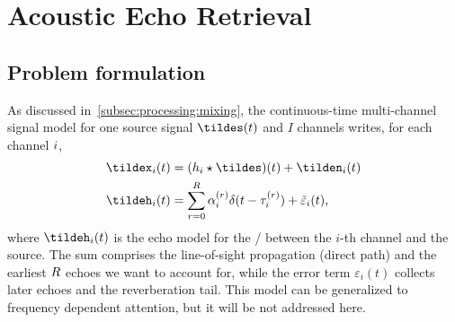 \chapter{Acoustic Echo Retrieval}\label{ch:estimation}
\vspace{-2.5em}
\synopsisChEstimation

\section{Problem formulation}\label{sec:estimation:problem}
As discussed in~\cref{subsec:processing:mixing}, the continuous-time multi-channel signal model for one source signal $\tildes(t)$ and $I$ channels writes, for each channel $i$,
\begin{equation}\label{eq:estimation:signalmodel}
    \begin{aligned}
        \tildex_i(t) &= (h_i \convCont \tildes)(t) + \tilden_i(t)\\
        \tildeh_i(t) &= \echoModelTimeSimple{i} + \tilde{\varepsilon}_i(t),
    \end{aligned}
\end{equation}
where $\tildeh_i(t)$ is the echo model for the \RIR/ between the $i$-th channel and the source.
The sum comprises the line-of-sight propagation (direct path) and the earliest $R$ echoes we want to account for, while the error term $\varepsilon_i(t)$ collects later echoes and the reverberation tail.
This model can be generalized to frequency dependent attention, but it will be not addressed here.


